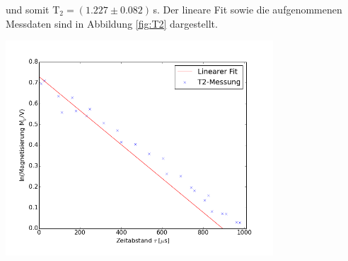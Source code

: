 \documentclass[]{scrartcl}
\begin{document}
und somit T$_2=(1.227 \pm 0.082)\,$s.
Der lineare Fit sowie die aufgenommenen Messdaten sind in Abbildung \ref{fig:T2} dargestellt.
\begin{center}
	\includegraphics[width=10cm]{images/plotT2.png}
	\label{fig:T2}
\end{center}
\end{document}
